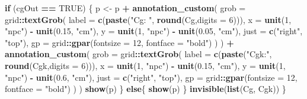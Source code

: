 \documentclass[
]{book}
\newenvironment{Shaded}{\begin{snugshade}}{\end{snugshade}}
\newcommand{\AttributeTok}[1]{\textcolor[rgb]{0.13,0.29,0.53}{#1}}
\newcommand{\ConstantTok}[1]{\textcolor[rgb]{0.56,0.35,0.01}{#1}}
\newcommand{\ControlFlowTok}[1]{\textcolor[rgb]{0.13,0.29,0.53}{\textbf{#1}}}
\newcommand{\DecValTok}[1]{\textcolor[rgb]{0.00,0.00,0.81}{#1}}
\newcommand{\FloatTok}[1]{\textcolor[rgb]{0.00,0.00,0.81}{#1}}
\newcommand{\FunctionTok}[1]{\textcolor[rgb]{0.13,0.29,0.53}{\textbf{#1}}}
\newcommand{\NormalTok}[1]{#1}
\newcommand{\OtherTok}[1]{\textcolor[rgb]{0.56,0.35,0.01}{#1}}
\newcommand{\SpecialCharTok}[1]{\textcolor[rgb]{0.81,0.36,0.00}{\textbf{#1}}}
\newcommand{\StringTok}[1]{\textcolor[rgb]{0.31,0.60,0.02}{#1}}
\begin{document}
\begin{Shaded}
\begin{Highlighting}[]
  \ControlFlowTok{if}\NormalTok{ (cgOut }\SpecialCharTok{==} \ConstantTok{TRUE}\NormalTok{) \{}
\NormalTok{    p }\OtherTok{\textless{}{-}}\NormalTok{ p }\SpecialCharTok{+}
      \FunctionTok{annotation\_custom}\NormalTok{(}
        \AttributeTok{grob =}\NormalTok{ grid}\SpecialCharTok{::}\FunctionTok{textGrob}\NormalTok{(}
          \AttributeTok{label =} \FunctionTok{c}\NormalTok{(}\FunctionTok{paste}\NormalTok{(}\StringTok{"Cg: "}\NormalTok{, }\FunctionTok{round}\NormalTok{(Cg,}\AttributeTok{digits =} \DecValTok{6}\NormalTok{))),}
          \AttributeTok{x =} \FunctionTok{unit}\NormalTok{(}\DecValTok{1}\NormalTok{, }\StringTok{"npc"}\NormalTok{) }\SpecialCharTok{{-}} \FunctionTok{unit}\NormalTok{(}\FloatTok{0.15}\NormalTok{, }\StringTok{"cm"}\NormalTok{),}
          \AttributeTok{y =} \FunctionTok{unit}\NormalTok{(}\DecValTok{1}\NormalTok{, }\StringTok{"npc"}\NormalTok{) }\SpecialCharTok{{-}} \FunctionTok{unit}\NormalTok{(}\FloatTok{0.05}\NormalTok{, }\StringTok{"cm"}\NormalTok{),}
          \AttributeTok{just =} \FunctionTok{c}\NormalTok{(}\StringTok{"right"}\NormalTok{, }\StringTok{"top"}\NormalTok{),}
          \AttributeTok{gp =}\NormalTok{ grid}\SpecialCharTok{::}\FunctionTok{gpar}\NormalTok{(}\AttributeTok{fontsize =} \DecValTok{12}\NormalTok{, }\AttributeTok{fontface =} \StringTok{"bold"}\NormalTok{)}
\NormalTok{        )}
\NormalTok{      ) }\SpecialCharTok{+} 
      \FunctionTok{annotation\_custom}\NormalTok{(}
        \AttributeTok{grob =}\NormalTok{ grid}\SpecialCharTok{::}\FunctionTok{textGrob}\NormalTok{(}
          \AttributeTok{label =} \FunctionTok{c}\NormalTok{(}\FunctionTok{paste}\NormalTok{(}\StringTok{"Cgk:"}\NormalTok{, }\FunctionTok{round}\NormalTok{(Cgk,}\AttributeTok{digits =} \DecValTok{6}\NormalTok{))),}
          \AttributeTok{x =} \FunctionTok{unit}\NormalTok{(}\DecValTok{1}\NormalTok{, }\StringTok{"npc"}\NormalTok{) }\SpecialCharTok{{-}} \FunctionTok{unit}\NormalTok{(}\FloatTok{0.15}\NormalTok{, }\StringTok{"cm"}\NormalTok{),}
          \AttributeTok{y =} \FunctionTok{unit}\NormalTok{(}\DecValTok{1}\NormalTok{, }\StringTok{"npc"}\NormalTok{) }\SpecialCharTok{{-}} \FunctionTok{unit}\NormalTok{(}\FloatTok{0.6}\NormalTok{, }\StringTok{"cm"}\NormalTok{),}
          \AttributeTok{just =} \FunctionTok{c}\NormalTok{(}\StringTok{"right"}\NormalTok{, }\StringTok{"top"}\NormalTok{),}
          \AttributeTok{gp =}\NormalTok{ grid}\SpecialCharTok{::}\FunctionTok{gpar}\NormalTok{(}\AttributeTok{fontsize =} \DecValTok{12}\NormalTok{, }\AttributeTok{fontface =} \StringTok{"bold"}\NormalTok{)}
\NormalTok{        )}
\NormalTok{      )}
    \FunctionTok{show}\NormalTok{(p)}
\NormalTok{  \}}
  \ControlFlowTok{else}\NormalTok{\{}
    \FunctionTok{show}\NormalTok{(p)}
\NormalTok{  \}}
  \FunctionTok{invisible}\NormalTok{(}\FunctionTok{list}\NormalTok{(Cg, Cgk))}
\NormalTok{\}}
\end{Highlighting}
\end{Shaded}
\end{document}
